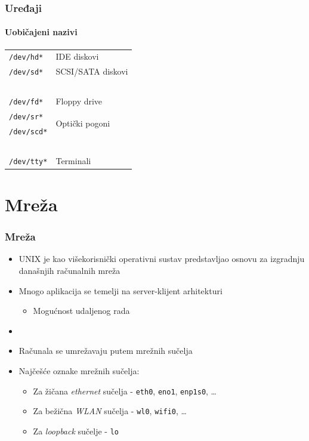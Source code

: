 \documentclass[table,usenames,dvipsnames]{beamer}
\newcommand{\shell}[1]{\texttt{#1}}
\begin{document}
\begin{frame}[t]
	\frametitle{Uređaji}
	\framesubtitle{Uobičajeni nazivi}
	\begin{tabular}{l l}
		\shell{/dev/hd*} & IDE diskovi\\
		\shell{/dev/sd*} & SCSI/SATA diskovi\\
		\,\\
		\shell{/dev/fd*} & Floppy drive\\
		\shell{/dev/sr*} & \multirow{2}{*}{Optički pogoni}\\
		\shell{/dev/scd*} & \\
		\,\\
		\shell{/dev/tty*} & Terminali
	\end{tabular}
\end{frame}

\section{Mreža}
\begin{frame}[t]
	\frametitle{Mreža}
	\begin{itemize}
		\item UNIX je kao višekorisnički operativni sustav predstavljao osnovu za izgradnju današnjih računalnih mreža
		\item Mnogo aplikacija se temelji na server-klijent arhitekturi
		\begin{itemize}
			\item Mogućnost udaljenog rada
		\end{itemize}
		\item[]
		\item Računala se umrežavaju putem mrežnih sučelja
		\item Najčešće oznake mrežnih sučelja:
		\begin{itemize}
			\item Za žičana \emph{ethernet} sučelja - \shell{eth0}, \shell{eno1}, \shell{enp1s0}, \ldots
			\item Za bežična \emph{WLAN} sučelja - \shell{wl0}, \shell{wifi0}, \ldots
			\item Za \emph{loopback} sučelje - \shell{lo}
		\end{itemize}
	\end{itemize}
\end{frame}
\end{document}
